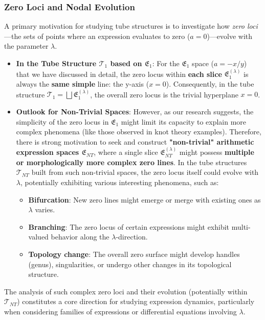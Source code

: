 \documentclass[12pt]{article}
\begin{document}
\subsubsection{Zero Loci and Nodal Evolution}\label{subsec:tube_zeros-full}

A primary motivation for studying tube structures is to investigate how \emph{zero loci}—the sets of points where an expression evaluates to zero ($a=0$)—evolve with the parameter $\lambda$.

\begin{itemize}
    \item \textbf{In the Tube Structure $\mathcal{T}_1$ based on $\mathfrak{E}_1$}: For the $\mathfrak{E}_1$ space ($a=-x/y$) that we have discussed in detail, the zero locus within \textbf{each slice} $\mathfrak{E}_1^{(\lambda)}$ is always the \textbf{same simple} line: the y-axis ($x=0$). Consequently, in the tube structure $\mathcal{T}_1 = \bigsqcup \mathfrak{E}_1^{(\lambda)}$, the overall zero locus is the trivial hyperplane $x=0$.

    \item \textbf{Outlook for Non-Trivial Spaces}: However, as our research suggests, the simplicity of the zero locus in $\mathfrak{E}_1$ might limit its capacity to explain more complex phenomena (like those observed in knot theory examples). Therefore, there is strong motivation to seek and construct \textbf{"non-trivial" arithmetic expression spaces $\mathfrak{E}_{NT}$}, where a single slice $\mathfrak{E}_{NT}^{(\lambda)}$ might possess \textbf{multiple or morphologically more complex zero lines}. In the tube structures $\mathcal{T}_{NT}$ built from such non-trivial spaces, the zero locus itself could evolve with $\lambda$, potentially exhibiting various interesting phenomena, such as:
    \begin{itemize}
        \item \textbf{Bifurcation}: New zero lines might emerge or merge with existing ones as $\lambda$ varies.
        \item \textbf{Branching}: The zero locus of certain expressions might exhibit multi-valued behavior along the $\lambda$-direction.
        \item \textbf{Topology change}: The overall zero surface might develop handles (genus), singularities, or undergo other changes in its topological structure.
    \end{itemize}
\end{itemize}
The analysis of such complex zero loci and their evolution (potentially within $\mathcal{T}_{NT}$) constitutes a core direction for studying expression dynamics, particularly when considering families of expressions or differential equations involving $\lambda$.
\end{document}
